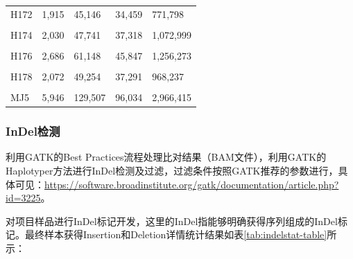\documentclass[
  a4paper,
  titlepage]{article}
\begin{document}
\begin{longtable}[t]{lllll}
H172 & 1,915 & 45,146 & 34,459 & 771,798\\
 
\cellcolor{gray!6}{H173} & \cellcolor{gray!6}{2,020} & \cellcolor{gray!6}{46,331} & \cellcolor{gray!6}{35,461} & \cellcolor{gray!6}{923,351}\\
 
H174 & 2,030 & 47,741 & 37,318 & 1,072,999\\
 
\cellcolor{gray!6}{H175} & \cellcolor{gray!6}{1,768} & \cellcolor{gray!6}{41,495} & \cellcolor{gray!6}{31,928} & \cellcolor{gray!6}{957,402}\\
 
H176 & 2,686 & 61,148 & 45,847 & 1,256,273\\
 
\cellcolor{gray!6}{H177} & \cellcolor{gray!6}{2,278} & \cellcolor{gray!6}{52,022} & \cellcolor{gray!6}{39,180} & \cellcolor{gray!6}{1,107,490}\\
 
H178 & 2,072 & 49,254 & 37,291 & 968,237\\
 
\cellcolor{gray!6}{H179} & \cellcolor{gray!6}{2,276} & \cellcolor{gray!6}{51,743} & \cellcolor{gray!6}{39,217} & \cellcolor{gray!6}{1,061,094}\\
 
MJ5 & 5,946 & 129,507 & 96,034 & 2,966,415\\*
\end{longtable}

\hypertarget{indelux68c0ux6d4b}{%
\subsubsection{InDel检测}\label{indelux68c0ux6d4b}}

利用GATK的Best Practices流程处理比对结果（BAM文件），利用GATK的Haplotyper方法进行InDel检测及过滤，过滤条件按照GATK推荐的参数进行，具体可见：\url{https://software.broadinstitute.org/gatk/documentation/article.php?id=3225}。

对项目样品进行InDel标记开发，这里的InDel指能够明确获得序列组成的InDel标记。最终样本获得Insertion和Deletion详情统计结果如表\ref{tab:indelstat-table}所示：
\end{document}

